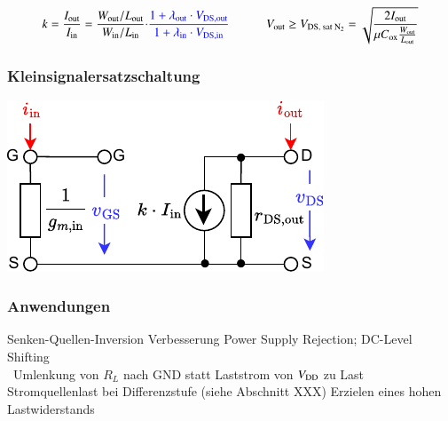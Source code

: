 \vspace{-0.2cm}

\[
    k = \frac{I_\text{out}}{I_\text{in}} = \frac{W_\text{out}/L_\text{out}}{W_\text{in}/L_\text{in}} {\color{blue} \cdot \frac{1 + \lambda_{\rm out} \cdot V_{\rm DS,out}}{1 + \lambda_{\rm in} \cdot V_{\rm DS,in}} }   \qquad \quad
    V_\text{out} \geq V_\text{DS, sat $\text{N}_2$} = \sqrt{\frac{2 I_\text{out}}{\mu C_\text{ox}\frac{W_{\rm out}}{L_{\rm out}}}}
\]


\begin{minipage}[t]{0.48\columnwidth}
    \subsubsection{Kleinsignalersatzschaltung}

    \includegraphics[width=\columnwidth, align=t]{images/06_stromspiegel_kleinsignalersatzschaltung.pdf}
\end{minipage}
\hfill
\begin{minipage}[t]{0.48\columnwidth}
    \raggedright
    \subsubsection{Anwendungen}

    \begin{outline}
        \1 Senken-Quellen-Inversion
        \1 Verbesserung Power Supply Rejection; DC-Level Shifting \\
            \textrightarrow\ Umlenkung von $R_L$ nach GND statt Laststrom von $V_{\rm DD}$ zu Last \\   %
        \1 Stromquellenlast bei Differenzstufe (siehe Abschnitt XXX) %
        \1 Erzielen eines hohen Lastwiderstands
    \end{outline}
\end{minipage}


